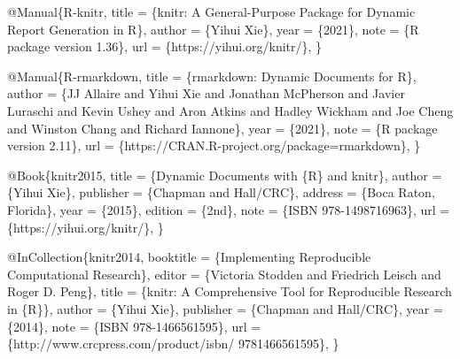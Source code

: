 \documentclass[
  11pt,
  lualatex,ja=standard,jafont=noto]{bxjsreport}
\newenvironment{Shaded}{\begin{snugshade}}{\end{snugshade}}
\newcommand{\DataTypeTok}[1]{\textcolor[rgb]{0.13,0.29,0.53}{#1}}
\newcommand{\NormalTok}[1]{#1}
\newcommand{\OtherTok}[1]{\textcolor[rgb]{0.56,0.35,0.01}{#1}}
\newcommand{\VariableTok}[1]{\textcolor[rgb]{0.00,0.00,0.00}{#1}}
\begin{document}
\begin{Shaded}
\begin{Highlighting}[]
\VariableTok{@Manual}\NormalTok{\{}\OtherTok{R}\NormalTok{{-}}\OtherTok{knitr}\NormalTok{,}
  \DataTypeTok{title}\NormalTok{ = \{knitr: A General{-}Purpose Package for Dynamic}
\NormalTok{    Report Generation in R\},}
  \DataTypeTok{author}\NormalTok{ = \{Yihui Xie\},}
  \DataTypeTok{year}\NormalTok{ = \{2021\},}
  \DataTypeTok{note}\NormalTok{ = \{R package version 1.36\},}
  \DataTypeTok{url}\NormalTok{ = \{https://yihui.org/knitr/\},}
\NormalTok{\}}

\VariableTok{@Manual}\NormalTok{\{}\OtherTok{R}\NormalTok{{-}}\OtherTok{rmarkdown}\NormalTok{,}
  \DataTypeTok{title}\NormalTok{ = \{rmarkdown: Dynamic Documents for R\},}
  \DataTypeTok{author}\NormalTok{ = \{JJ Allaire and Yihui Xie and Jonathan McPherson}
\NormalTok{    and Javier Luraschi and Kevin Ushey and Aron Atkins}
\NormalTok{    and Hadley Wickham and Joe Cheng and Winston Chang and}
\NormalTok{    Richard Iannone\},}
  \DataTypeTok{year}\NormalTok{ = \{2021\},}
  \DataTypeTok{note}\NormalTok{ = \{R package version 2.11\},}
  \DataTypeTok{url}\NormalTok{ = \{https://CRAN.R{-}project.org/package=rmarkdown\},}
\NormalTok{\}}

\VariableTok{@Book}\NormalTok{\{}\OtherTok{knitr2015}\NormalTok{,}
  \DataTypeTok{title}\NormalTok{ = \{Dynamic Documents with \{R\} and knitr\},}
  \DataTypeTok{author}\NormalTok{ = \{Yihui Xie\},}
  \DataTypeTok{publisher}\NormalTok{ = \{Chapman and Hall/CRC\},}
  \DataTypeTok{address}\NormalTok{ = \{Boca Raton, Florida\},}
  \DataTypeTok{year}\NormalTok{ = \{2015\},}
  \DataTypeTok{edition}\NormalTok{ = \{2nd\},}
  \DataTypeTok{note}\NormalTok{ = \{ISBN 978{-}1498716963\},}
  \DataTypeTok{url}\NormalTok{ = \{https://yihui.org/knitr/\},}
\NormalTok{\}}

\VariableTok{@InCollection}\NormalTok{\{}\OtherTok{knitr2014}\NormalTok{,}
  \DataTypeTok{booktitle}\NormalTok{ = \{Implementing Reproducible Computational}
\NormalTok{    Research\},}
  \DataTypeTok{editor}\NormalTok{ = \{Victoria Stodden and Friedrich Leisch and Roger}
\NormalTok{    D. Peng\},}
  \DataTypeTok{title}\NormalTok{ = \{knitr: A Comprehensive Tool for Reproducible}
\NormalTok{    Research in \{R\}\},}
  \DataTypeTok{author}\NormalTok{ = \{Yihui Xie\},}
  \DataTypeTok{publisher}\NormalTok{ = \{Chapman and Hall/CRC\},}
  \DataTypeTok{year}\NormalTok{ = \{2014\},}
  \DataTypeTok{note}\NormalTok{ = \{ISBN 978{-}1466561595\},}
  \DataTypeTok{url}\NormalTok{ = \{http://www.crcpress.com/product/isbn/}
\NormalTok{    9781466561595\},}
\NormalTok{\}}


\end{Highlighting}
\end{Shaded}
\end{document}
